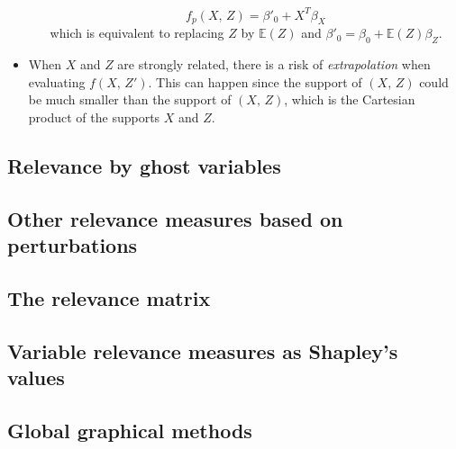 \begin{itemize}
\begin{itemize}
                \begin{equation*}
                    f_p(X,\,Z) = \beta'_0 + X^T\beta_X
                \end{equation*}
                which is equivalent to replacing $Z$ by $\mathds{E}(Z)$ and
                $\beta'_0 = \beta_0 + \mathds{E}(Z)\beta_Z$.
        \end{itemize}
    \item When $X$ and $Z$ are strongly related, there is a risk of
        \emph{extrapolation} when evaluating $f(X,\,Z')$. This can happen since
        the support of
        $(X,\,Z)$ could be much smaller than the support of $(X,\,Z)$, which
        is the Cartesian product of the supports $X$ and $Z$.
\end{itemize}

\subsection{Relevance by ghost variables}
\subsection{Other relevance measures based on perturbations}
\subsection{The relevance matrix}
\subsection{Variable relevance measures as Shapley’s values}
\subsection{Global graphical methods}


